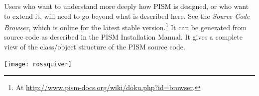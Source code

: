 \documentclass[titlepage,letterpaper,final]{scrartcl}
\begin{document}
Users who want to understand more deeply how PISM is designed, or who want to extend it,  will need to go beyond what is described here.  See the \emph{Source Code Browser}, which is online for the latest stable version.\footnote{At \url{http://www.pism-docs.org/wiki/doku.php?id=browser}.}  It can be generated from source code as described in the PISM Installation Manual.  It gives a complete view of the class/object structure of the PISM source code.


\vspace{.3in}
  
\begin{center}
\texttt{[image: rossquiver]}
\end{center}

\vspace{.2in}

\begin{center}
\end{center}


\clearpage\newpage


\clearpage\newpage


\clearpage\newpage


\clearpage\newpage


\clearpage\newpage


\clearpage\newpage


\clearpage\newpage


\clearpage\newpage


\clearpage\newpage


\clearpage\newpage


\clearpage\newpage


%

\clearpage\newpage


\clearpage\newpage
{}
{}



{}
\label{sec:index}
\printindex

{}
\printindex[options]
\end{document}
